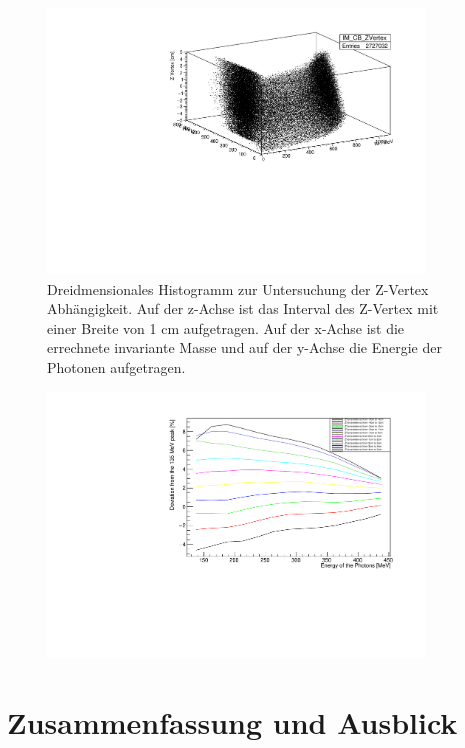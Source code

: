 \documentclass[a4paper,11pt,oneside,final,german,openbib,pdftex]{scrbook}
\begin{document}
\begin{figure}[h!]
	\begin{center}
		\includegraphics[width=100mm]{ZVertex3DHisto}
		\caption{Dreidmensionales Histogramm zur Untersuchung der Z-Vertex Abh\"angigkeit. Auf der z-Achse ist das Interval des Z-Vertex mit einer Breite von 1 cm aufgetragen. Auf der x-Achse ist die errechnete invariante Masse und auf der y-Achse die Energie der Photonen aufgetragen.}
		\label{fig:Z-Vertex-3D-Histogramm}
	\end{center}
\end{figure}

\begin{figure}[h!]
	\begin{center}
		\includegraphics[width=100mm]{FullZVertexDependence}
	\end{center}
\end{figure}


\chapter{Zusammenfassung und Ausblick}
\end{document}
